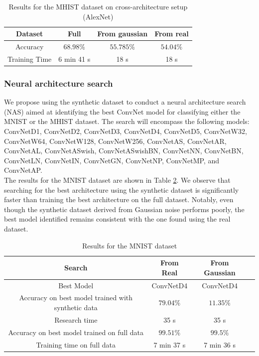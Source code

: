 \documentclass[onecolumn]{IEEEtran}
\begin{document}
\begin{table}[H]
    \centering
    \begin{tabular}{|c|c|c|c|}
        \hline
        Dataset & Full & From gaussian & From real \\
        \hline
        Accuracy & $68.98\%$ & $55.785\%$ & $54.04\%$ \\
        \hline
        Training Time & 6 min 41 s & 18 s & 18 s \\
        \hline
    \end{tabular}
    \caption{Results for the MHIST dataset on cross-architecture setup (AlexNet)}
    \label{tab:MHIST_pad_results_cross_architecture}
\end{table}

\subsubsection{Neural architecture search}

We propose using the synthetic dataset to conduct a neural architecture search (NAS) aimed at identifying the best ConvNet model for classifying either the MNIST or the MHIST dataset. The search will encompass the following models: ConvNetD1, ConvNetD2, ConvNetD3, ConvNetD4, ConvNetD5, ConvNetW32, ConvNetW64, ConvNetW128, ConvNetW256, ConvNetAS, ConvNetAR, ConvNetAL, ConvNetASwish, ConvNetASwishBN, ConvNetNN, ConvNetBN, ConvNetLN, ConvNetIN, ConvNetGN, ConvNetNP, ConvNetMP, and ConvNetAP.
\\
The results for the MNIST dataset are shown in Table \ref{tab:NAS_results_MNIST}. We observe that searching for the best architecture using the synthetic dataset is significantly faster than training the best architecture on the full dataset. Notably, even though the synthetic dataset derived from Gaussian noise performs poorly, the best model identified remains consistent with the one found using the real dataset.

\begin{table}[H]
    \centering
    \begin{tabular}{|c|c|c|c|}
        \hline
        Search & From Real & From Gaussian \\
        \hline
        Best Model & ConvNetD4 & ConvNetD4\\
        \hline
        Accuracy on best model trained with synthetic data & $79.04\%$ & $11.35\%$ \\
        \hline
        Research time & 35 s & 35 s \\
        \hline
        Accuracy on best model trained on full data & $99.51\%$ & $99.5\%$ \\
        \hline
        Training time on full data & 7 min 37 s & 7 min 36 s \\
        \hline
    \end{tabular}
    \caption{Results for the MNIST dataset}
    \label{tab:NAS_results_MNIST}
\end{table}
\end{document}
